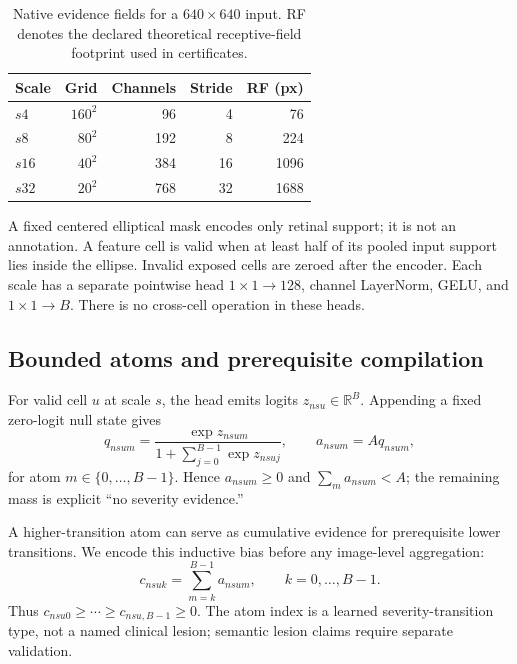 \documentclass[10pt,twocolumn,letterpaper]{article}
\newcommand{\R}{\mathbb{R}}
\begin{document}
\begin{table}[t]
  \centering
  \caption{Native evidence fields for a $640\times640$ input.  RF denotes the
  declared theoretical receptive-field footprint used in certificates.}
  \label{tab:fields}
  \setlength{\tabcolsep}{4.2pt}
  \begin{tabular}{@{}lrrrr@{}}
    \toprule
    Scale & Grid & Channels & Stride & RF (px) \\
    \midrule
    $s4$  & $160^2$ & 96  & 4  & 76 \\
    $s8$  & $80^2$  & 192 & 8  & 224 \\
    $s16$ & $40^2$  & 384 & 16 & 1096 \\
    $s32$ & $20^2$  & 768 & 32 & 1688 \\
    \bottomrule
  \end{tabular}
\end{table}

A fixed centered elliptical mask encodes only retinal support; it is not an
annotation.  A feature cell is valid when at least half of its pooled input
support lies inside the ellipse.  Invalid exposed cells are zeroed after the
encoder.  Each scale has a separate pointwise head
$1\!\times\!1\rightarrow128$, channel LayerNorm, GELU, and
$1\!\times\!1\rightarrow B$.  There is no cross-cell operation in these
heads.

\subsection{Bounded atoms and prerequisite compilation}
\label{sec:atoms}

For valid cell $u$ at scale $s$, the head emits logits
$z_{nsu}\in\R^B$.  Appending a fixed zero-logit null state gives
\begin{equation}
q_{nsum}=
\frac{\exp z_{nsum}}
{1+\sum_{j=0}^{B-1}\exp z_{nsuj}},
\qquad
a_{nsum}=Aq_{nsum},
\label{eq:null-simplex}
\end{equation}
for atom $m\in\{0,\ldots,B-1\}$.  Hence $a_{nsum}\geq0$ and
$\sum_m a_{nsum}<A$; the remaining mass is explicit ``no severity evidence.''

A higher-transition atom can serve as cumulative evidence for prerequisite
lower transitions.  We encode this inductive bias before any image-level
aggregation:
\begin{equation}
c_{nsuk}=\sum_{m=k}^{B-1}a_{nsum},
\qquad k=0,\ldots,B-1.
\label{eq:compiler}
\end{equation}
Thus $c_{nsu0}\geq\cdots\geq c_{nsu,B-1}\geq0$.  The atom index is a learned
severity-transition type, not a named clinical lesion; semantic lesion claims
require separate validation.
\end{document}

